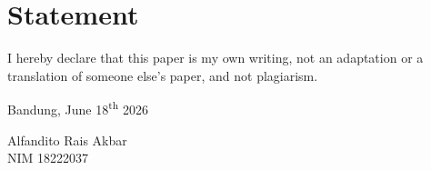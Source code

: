 \section*{Statement}

\newlength{\signaturewidth}
\settowidth{\signaturewidth}{Alfandito Rais Akbar}

I hereby declare that this paper is my own writing, not an adaptation or a translation of someone else’s paper, and not plagiarism.

\vspace{1.0em}
\begin{flushright}
Bandung, June 18\textsuperscript{th} 2026


\vspace{4.0em}
Alfandito Rais Akbar\\
NIM 18222037
\end{flushright}
